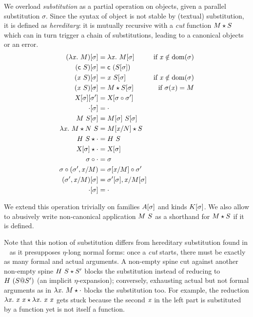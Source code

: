 \documentclass[9pt]{sigplanconf}
\begin{document}
We overload \emph{substitution} as a partial operation on objects,
given a parallel substitution $\sigma$. Since the syntax of object is
not stable by (textual) substitution, it is defined as
\emph{hereditary}: it is mutually recursive with a \emph{cut} function
${M}\star{S}$ which can in turn trigger a chain of substitutions,
leading to a canonical objects or an error.
\begin{align*}
  {(\lambda{\ensuremath{\text{\textit{x}}}}.\ M)}[{\sigma}] &= \lambda{\ensuremath{\text{\textit{x}}}}.\  {{M}[{\sigma}]} &
  \text{if $\text{\textit{x}}\notin \operatorname{dom}{\!(\sigma)}$}
  \\
  {({\text{\textsf{c}}}\  S)}[{\sigma}] &= {\text{\textsf{c}}}\  {({S}[{\sigma}])}
  \\
  {({\text{\textit{x}}}\  S)}[{\sigma}] &=
  {\text{\textit{x}}}\  {{S}[{\sigma}]} &
  \text{if $\text{\textit{x}}\notin \operatorname{dom}{\!(\sigma)}$}
  \\
  {({\text{\textit{x}}}\  S)}[{\sigma}] &=
  {M}\star{{S}[{\sigma}]} &
  \text{if $\sigma(\text{\textit{x}}) = M$}
  \\
  {{\text{\textsl{X}}}[{\sigma}]}[{\sigma'}] &=
  {\text{\textsl{X}}}[{{\sigma}\circ{\sigma'}}]
  \\
  {\cdot}[{\sigma}] &=
  \cdot \\
  {{M}\ {S}}[{\sigma}] &=
  {{M}[{\sigma}]}\ {{S}[{\sigma}]}
  \\
  {\lambda{\ensuremath{\text{\textit{x}}}}.\  M}\star{{N}\ {S}} &=
  {{M}[{{\text{\textit{x}}}/{N}}]}\star{S}
  \\
  {{H}\  S}\star{\cdot} &=
  {H}\  S
  \\
  {{\text{\textsl{X}}}[{\sigma}]}\star{\cdot} &= {\text{\textsl{X}}}[{\sigma}]
  \\
  {\sigma}\circ{\cdot} &=
  \sigma
  \\
  {\sigma}\circ{({\sigma'},{{\ensuremath{\text{\textit{x}}}}/{M}})} &=
  {{\sigma}[{{\text{\textit{x}}}/{M}}]}\circ{\sigma}'
  \\
  {({\sigma'},{{\text{\textit{x}}}/{M}})}[{\sigma}] &=
  {{\sigma'}[{\sigma}]},{{\text{\textit{x}}}/{{M}[{\sigma}]}}
  \\
  {\cdot}[{\sigma}] &= \cdot
\end{align*}

We extend this operation trivially on families ${A}[{\sigma}]$ and
kinds ${K}[{\sigma}]$. We also allow to abusively write
non-canonical application ${M}\  S$ as a shorthand for ${M}\star{S}$
if it is defined.

Note that this notion of substitution differs from hereditary
substitution found in \eg\ \cite{hl07mechanizing} as it presupposes
$\eta$-long normal forms: once a \emph{cut} starts, there must be
exactly as many formal and actual arguments. A non-empty spine cut
against another non-empty spine ${{H}\  S}\star{S'}$ blocks the
substitution instead of reducing to ${H}\  {({S}@{S}')}$ (an
implicit $\eta$-expansion); conversely, exhausting actual but not
formal arguments as in ${\lambda{\ensuremath{\text{\textit{x}}}}.\  M}\star{\cdot}$ blocks the
substitution too. For example, the reduction ${\lambda{\ensuremath{\text{\textit{x}}}}.\  {\text{\textit{x}}}\ {\text{\textit{x}}}}\star{\lambda{\ensuremath{\text{\textit{x}}}}.\ {\ensuremath{\text{\textit{x}}}}\ {\ensuremath{\text{\textit{x}}}}}$ gets stuck because the
second $\text{\textit{x}}$ in the left part is substituted by a function yet is
not itself a function.
\end{document}
